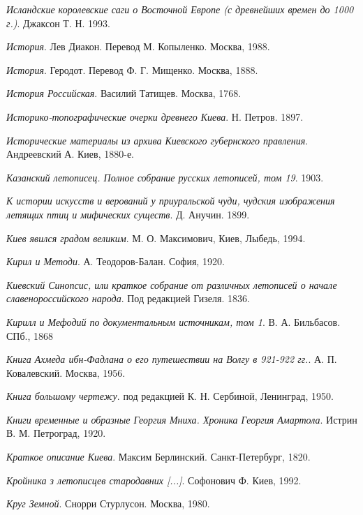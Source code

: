 \emph{Исландские королевские саги о Восточной Европе (с древнейших времен до 1000 г.)}. Джаксон Т. Н. 1993.

\emph{История}. Лев Диакон. Перевод М. Копыленко. Москва, 1988.

\emph{История}. Геродот. Перевод Ф. Г. Мищенко. Москва, 1888.

\emph{История Российская}. Василий Татищев. Москва, 1768.

\emph{Историко-топографические очерки древнего Киева}. Н. Петров. 1897.

\emph{Исторические материалы из архива Киевского губернского правления}. Андреевский А. Киев, 1880-е.

\emph{Казанский летописец. Полное собрание русских летописей, том 19}. 1903.

\emph{К истории искусств и верований у приуральской чуди, чудския изображения летящих птиц и мифических существ}. Д. Анучин. 1899.

\emph{Киев явился градом великим}. М. О. Максимович, Киев, Лыбедь, 1994.


\emph{Кирил и Методи}. А. Теодоров-Балан. София, 1920.

\emph{Киевский Синопсис, или краткое собрание от различных летописей о начале славенороссийского народа}. Под редакцией Гизеля. 1836.

\emph{Кирилл и Мефодий по документальным источникам, том 1}. В. А. Бильбасов. СПб., 1868 

\emph{Книга Ахмеда ибн-Фадлана о его путешествии на Волгу в 921-922 гг.}. А. П. Ковалевский. Москва, 1956.

\emph{Книга большому чертежу}. под редакцией К. Н. Сербиной, Ленинград, 1950.

\emph{Книги временные и образные Георгия Мниха. Хроника Георгия Амартола}. Истрин В. М. Петроград, 1920.

\emph{Краткое описание Киева}. Максим Берлинский. Санкт-Петербург, 1820.

\emph{Кройника з летописцев стародавних [...]}. Софонович Ф. Киев, 1992.

\emph{Круг Земной}. Снорри Стурлусон. Москва, 1980.

